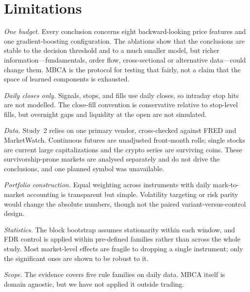 \section{Limitations}
\label{sec:limitations}

\emph{One budget.} Every conclusion concerns eight backward-looking price features and one gradient-boosting
configuration. The ablations show that the conclusions are stable to the decision threshold and to a much smaller
model, but richer information---fundamentals, order flow, cross-sectional or alternative data---could change them.
MBCA is the protocol for testing that fairly, not a claim that the space of learned components is exhausted.

\emph{Daily closes only.} Signals, stops, and fills use daily closes, so intraday stop hits are not modelled. The
close-fill convention is conservative relative to stop-level fills, but overnight gaps and liquidity at the open are
not simulated.

\emph{Data.} Study~2 relies on one primary vendor, cross-checked against FRED and MarketWatch. Continuous futures are
unadjusted front-month rolls; single stocks are current large capitalizations and the crypto series are surviving
coins. These survivorship-prone markets are analysed separately and do not drive the conclusions, and one planned
symbol was unavailable.

\emph{Portfolio construction.} Equal weighting across instruments with daily mark-to-market accounting is transparent
but simple. Volatility targeting or risk parity would change the absolute numbers, though not the paired
variant-versus-control design.

\emph{Statistics.} The block bootstrap assumes stationarity within each window, and FDR control is applied within
pre-defined families rather than across the whole study. Most market-level effects are fragile to dropping a single
instrument; only the significant ones are shown to be robust to it.

\emph{Scope.} The evidence covers five rule families on daily data. MBCA itself is domain agnostic, but we have not
applied it outside trading.
